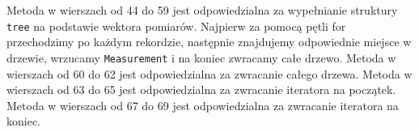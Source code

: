 Metoda w wierszach od 44 do 59 jest odpowiedzialna za wypełnianie struktury \texttt{tree} na podstawie wektora pomiarów. Najpierw za pomocą pętli for przechodzimy po każdym rekordzie, następnie znajdujemy odpowiednie miejsce w drzewie, wrzucamy \texttt{Measurement} i na koniec zwracamy całe drzewo.
Metoda w wierszach od 60 do 62 jest odpowiedzialna za zwracanie całego drzewa.
Metoda w wierszach od 63 do 65 jest odpowiedzialna za zwracanie iteratora na początek.
Metoda w wierszach od 67 do 69 jest odpowiedzialna za zwracanie iteratora na koniec.
